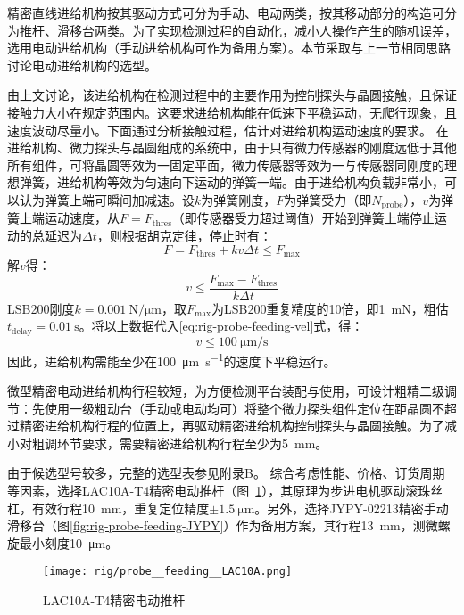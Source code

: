精密直线进给机构按其驱动方式可分为手动、电动两类，按其移动部分的构造可分为推杆、滑移台两类。为了实现检测过程的自动化，减小人操作产生的随机误差，选用电动进给机构（手动进给机构可作为备用方案）。本节采取与上一节相同思路讨论电动进给机构的选型。

由上文讨论，该进给机构在检测过程中的主要作用为控制探头与晶圆接触，且保证接触力大小在规定范围内。这要求进给机构能在低速下平稳运动，无爬行现象，且速度波动尽量小。下面通过分析接触过程，估计对进给机构运动速度的要求。
在进给机构、微力探头与晶圆组成的系统中，由于只有微力传感器的刚度远低于其他所有组件，可将晶圆等效为一固定平面，微力传感器等效为一与传感器同刚度的理想弹簧，进给机构等效为匀速向下运动的弹簧一端。由于进给机构负载非常小，可以认为弹簧上端可瞬间加减速。设$k$为弹簧刚度，$F$为弹簧受力（即$N_{\mathrm{probe}}$），$v$为弹簧上端运动速度，从$F = F_{\mathrm{thres}}$（即传感器受力超过阈值）开始到弹簧上端停止运动的总延迟为$\Delta t$，则根据胡克定律，停止时有：
\begin{equation}
\label{eq:rig-probe-feeding-force}
F = F_{\mathrm{thres}} + k v \Delta t \leq F_{\max}
\end{equation}
解$v$得：
\begin{equation}
\label{eq:rig-probe-feeding-vel}
v \leq \frac{ F_{\max} - F_{\mathrm{thres}} }
            { k \Delta t }
\end{equation}
LSB200刚度$k = \SI{0.001}{\newton\per\micro\meter}$，取$F_{\max}$为LSB200重复精度的10倍，即\SI{1}{\milli\newton}，粗估$t_{\mathrm{delay}} = \SI{0.01}{\second}$。将以上数据代入\eqref{eq:rig-probe-feeding-vel}式，得：
\[
v \leq \SI{100}{\micro\meter\per\second}
\]
因此，进给机构需能至少在\SI{100}{\micro\meter\per\second}的速度下平稳运行。

微型精密电动进给机构行程较短，为方便检测平台装配与使用，可设计粗精二级调节：先使用一级粗动台（手动或电动均可）将整个微力探头组件定位在距晶圆不超过精密进给机构行程的位置上，再驱动精密进给机构控制探头与晶圆接触。为了减小对粗调环节要求，需要精密进给机构行程至少为\SI{5}{\milli\meter}。

由于候选型号较多，完整的选型表参见附录B。
综合考虑性能、价格、订货周期等因素，选择LAC10A-T4精密电动推杆（图~\ref{fig:rig-probe-feeding-LAC10A}），其原理为步进电机驱动滚珠丝杠，有效行程\SI{10}{\milli\meter}，重复定位精度$\pm\SI{1.5}{\micro\meter}$。另外，选择JYPY-02213精密手动滑移台（图\ref{fig:rig-probe-feeding-JYPY}）作为备用方案，其行程\SI{13}{\milli\meter}，测微螺旋最小刻度\SI{10}{\micro\meter}。

\begin{figure}[tbh]
\centering
\texttt{[image: rig/probe\_\_feeding\_\_LAC10A.png]}
\caption{LAC10A-T4精密电动推杆}
\label{fig:rig-probe-feeding-LAC10A}
\end{figure}

